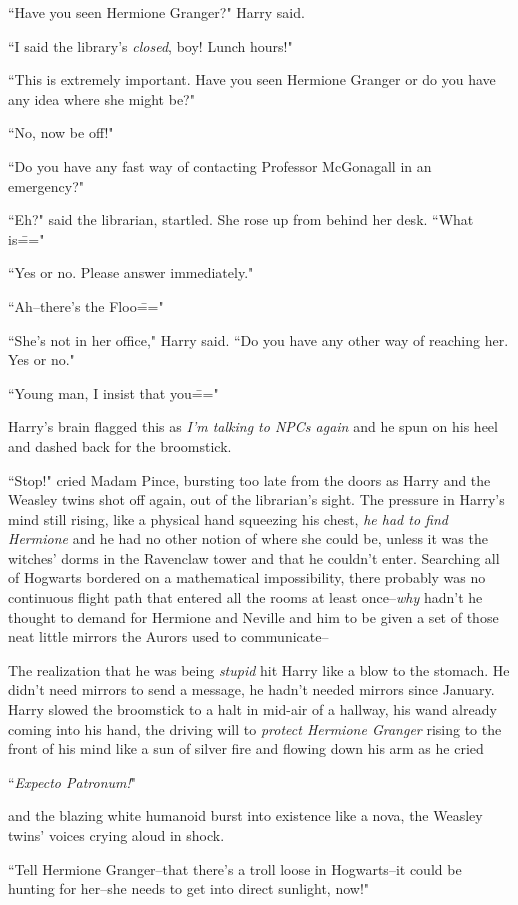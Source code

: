 ``Have you seen Hermione Granger?" Harry said.

``I said the library's \emph{closed}, boy! Lunch hours!"

``This is extremely important. Have you seen Hermione Granger or do you have any idea where she might be?"

``No, now be off!"

``Do you have any fast way of contacting Professor McGonagall in an emergency?"

``Eh?" said the librarian, startled. She rose up from behind her desk. ``What is\==="

``Yes or no. Please answer immediately."

``Ah\---there's the Floo\==="

``She's not in her office," Harry said. ``Do you have any other way of reaching her. Yes or no."

``Young man, I insist that you\==="

Harry's brain flagged this as \emph{I'm talking to NPCs again} and he spun on his heel and dashed back for the broomstick.

``Stop!" cried Madam Pince, bursting too late from the doors as Harry and the Weasley twins shot off again, out of the librarian's sight. The pressure in Harry's mind still rising, like a physical hand squeezing his chest, \emph{he had to find Hermione} and he had no other notion of where she could be, unless it was the witches' dorms in the Ravenclaw tower and that he couldn't enter. Searching all of Hogwarts bordered on a mathematical impossibility, there probably was no continuous flight path that entered all the rooms at least once\---\emph{why} hadn't he thought to demand for Hermione and Neville and him to be given a set of those neat little mirrors the Aurors used to communicate\---

The realization that he was being \emph{stupid} hit Harry like a blow to the stomach. He didn't need mirrors to send a message, he hadn't needed mirrors since January. Harry slowed the broomstick to a halt in mid-air of a hallway, his wand already coming into his hand, the driving will to \emph{protect Hermione Granger} rising to the front of his mind like a sun of silver fire and flowing down his arm as he cried

``\emph{Expecto Patronum!}"

and the blazing white humanoid burst into existence like a nova, the Weasley twins' voices crying aloud in shock.

``Tell Hermione Granger\---that there's a troll loose in Hogwarts\---it could be hunting for her\---she needs to get into direct sunlight, now!"

